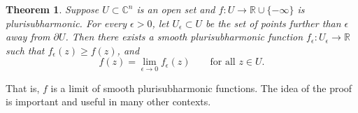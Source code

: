 \documentclass[12pt,openany]{book}
\newcommand{\C}{{\mathbb{C}}}
\newcommand{\R}{{\mathbb{R}}}
\theoremstyle{plain}
\newtheorem{thm}{Theorem}[section]
\theoremstyle{remark}
\theoremstyle{definition}
\theoremstyle{exercise}
\theoremstyle{example}
\begin{document}
\pagebreak[2]
\begin{thm} \label{thm:subharlim}
Suppose $U \subset \C^n$ is an open set and $f \colon U \to \R \cup \{
-\infty \}$ is plurisubharmonic.  For every $\epsilon > 0$,
let $U_\epsilon \subset U$
be the set of points further than $\epsilon$ away from $\partial U$.
Then there exists a smooth plurisubharmonic function
$f_\epsilon \colon U_\epsilon \to \R$ such that $f_\epsilon(z) \geq
f(z)$, and
\begin{equation*}
f(z) = \lim_{\epsilon \to 0} f_\epsilon(z) \qquad \text{for all $z \in U$}.
\end{equation*}
\end{thm}

That is, $f$ is a limit of smooth plurisubharmonic functions.
The idea of the proof is important and useful in many other
contexts.
\end{document}
